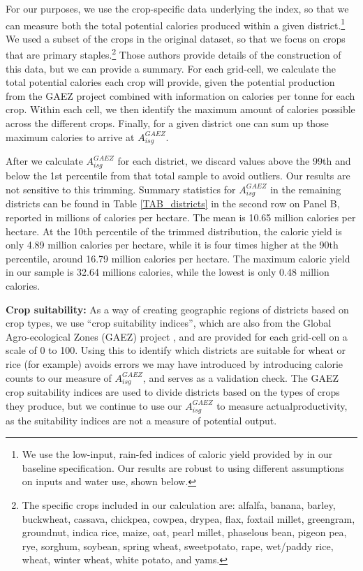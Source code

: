 \documentclass[11pt]{article}
\begin{document}
For our purposes, we use the crop-specific data underlying the \citet{galorozak2016} index, so that we can measure both the total potential calories produced within a given district.\footnote{We use the low-input, rain-fed indices of caloric yield provided by \citet{galorozak2016} in our baseline specification. Our results are robust to using different assumptions on inputs and water use, shown below.} We used a subset of the crops in the original \citet{galorozak2016} dataset, so that we focus on crops that are primary staples.\footnote{The specific crops included in our calculation are: alfalfa, banana, barley, buckwheat, cassava, chickpea, cowpea, drypea, flax, foxtail millet, greengram, groundnut, indica rice, maize, oat, pearl millet, phaselous bean, pigeon pea, rye, sorghum, soybean, spring wheat, sweetpotato, rape, wet/paddy rice, wheat, winter wheat, white potato, and yams.} Those authors provide details of the construction of this data, but we can provide a summary. For each grid-cell, we calculate the total potential calories each crop will provide, given the potential production from the GAEZ project \citep{gaez} combined with information on calories per tonne for each crop. Within each cell, we then identify the maximum amount of calories possible across the different crops. Finally, for a given district one can sum up those maximum calories to arrive at $A^{GAEZ}_{isg}$.

After we calculate $A^{GAEZ}_{isg}$ for each district, we discard values above the 99th and below the 1st percentile from that total sample to avoid outliers. Our results are not sensitive to this trimming. Summary statistics for $A^{GAEZ}_{isg}$ in the remaining districts can be found in Table \ref{TAB_districts} in the second row on Panel B, reported in millions of calories per hectare. The mean is 10.65 million calories per hectare. At the 10th percentile of the trimmed distribution, the caloric yield is only 4.89 million calories per hectare, while it is four times higher at the 90th percentile, around 16.79 million calories per hectare. The maximum caloric yield in our sample is 32.64 millions calories, while the lowest is only 0.48 million calories. 

\vspace{.5cm}\noindent\textbf{Crop suitability:} As a way of creating geographic regions of districts based on crop types, we use ``crop suitability indices'', which are also from the Global Agro-ecological Zones (GAEZ) project \citep{gaez}, and are provided for each grid-cell on a scale of 0 to 100. Using this to identify which districts are suitable for wheat or rice (for example) avoids errors we may have introduced by introducing calorie counts to our measure of $A^{GAEZ}_{isg}$, and serves as a validation check. The GAEZ crop suitability indices are used to divide districts based on the types of crops they produce, but we continue to use our $A^{GAEZ}_{isg}$ to measure actualproductivity, as the suitability indices are not a measure of potential output.
\end{document}

